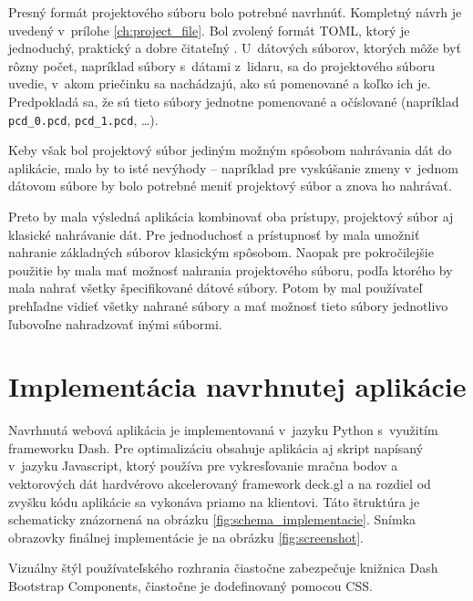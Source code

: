 Presný formát projektového súboru bolo potrebné navrhnúť. Kompletný návrh je uvedený v~prílohe \ref{ch:project_file}. Bol zvolený formát TOML, ktorý je jednoduchý, praktický a dobre čitateľný \cite{toml}. U~dátových súborov, ktorých môže byť rôzny počet, napríklad súbory s~dátami z~lidaru, sa do projektového súboru uvedie, v~akom priečinku sa nachádzajú, ako sú pomenované a koľko ich je. Predpokladá sa, že sú tieto súbory jednotne pomenované a očíslované (napríklad \texttt{pcd\_0.pcd}, \texttt{pcd\_1.pcd}, \dots).

Keby však bol projektový súbor jediným možným spôsobom nahrávania dát do aplikácie, malo by to isté nevýhody -- napríklad pre vyskúšanie zmeny v~jednom dátovom súbore by bolo potrebné meniť projektový súbor a znova ho nahrávať.

Preto by mala výsledná aplikácia kombinovať oba prístupy, projektový súbor aj klasické nahrávanie dát. Pre jednoduchosť a prístupnosť by mala umožniť nahranie základných súborov klasickým spôsobom. Naopak pre pokročilejšie použitie by mala mať možnosť nahrania projektového súboru, podľa ktorého by mala nahrať všetky špecifikované dátové súbory. Potom by mal používateľ prehľadne vidieť všetky nahrané súbory a mať možnosť tieto súbory jednotlivo ľubovoľne nahradzovať inými súbormi.

\chapter{Implementácia navrhnutej aplikácie}
\label{ch:implementacia}

Navrhnutá webová aplikácia je implementovaná v~jazyku Python s~využitím frameworku Dash. Pre optimalizáciu obsahuje aplikácia aj skript napísaný v~jazyku Javascript, ktorý používa pre vykresľovanie mračna bodov a vektorových dát hardvérovo akcelerovaný framework deck.gl a na rozdiel od zvyšku kódu aplikácie sa vykonáva priamo na klientovi. Táto štruktúra je schematicky znázornená na obrázku \ref{fig:schema_implementacie}. Snímka obrazovky finálnej implementácie je na obrázku \ref{fig:screenshot}.

Vizuálny štýl používateľského rozhrania čiastočne zabezpečuje knižnica Dash Bootstrap Components, čiastočne je dodefinovaný pomocou CSS.

